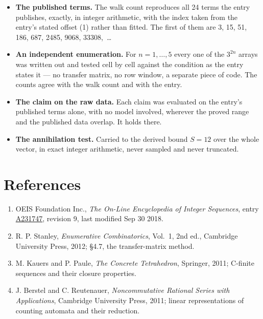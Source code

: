 \documentclass[11pt]{article}
\theoremstyle{definition}
\begin{document}
\begin{itemize}

\item {\bfseries The published terms.} The walk count reproduces all 24 terms the entry publishes, exactly, in integer arithmetic, with the index taken from the entry's stated offset (1) rather than fitted. The first of them are 3, 15, 51, 186, 687, 2485, 9068, 33308,~\dots

\item {\bfseries An independent enumeration.} For $n = 1,\dots,5$ every one of the $3^{2n}$ arrays was written out and tested cell by cell against the condition as the entry states it --- no transfer matrix, no row window, a separate piece of code. The counts agree with the walk count and with the entry.

\item {\bfseries The claim on the raw data.} Each claim was evaluated on the entry's published terms alone, with no model involved, wherever the proved range and the published data overlap. It holds there.

\item {\bfseries The annihilation test.} Carried to the derived bound $S = 12$ over the whole vector, in exact integer arithmetic, never sampled and never truncated.

\end{itemize}

\section{References}

\begin{enumerate}

\item OEIS Foundation Inc., \emph{The On-Line Encyclopedia of Integer Sequences}, entry \href{https://oeis.org/A231747}{A231747}, revision 9, last modified Sep 30 2018.

\item R. P. Stanley, \emph{Enumerative Combinatorics}, Vol.~1, 2nd ed., Cambridge University Press, 2012; \S4.7, the transfer-matrix method.

\item M. Kauers and P. Paule, \emph{The Concrete Tetrahedron}, Springer, 2011; C-finite sequences and their closure properties.

\item J. Berstel and C. Reutenauer, \emph{Noncommutative Rational Series with Applications}, Cambridge University Press, 2011; linear representations of counting automata and their reduction.

\end{enumerate}
\end{document}
